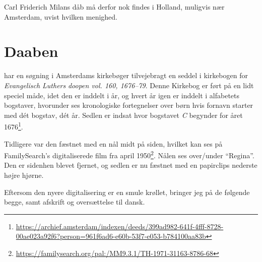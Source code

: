 \documentclass[
	a4paper,
	12pt,
	final
]{memoir}
\begin{document}
Carl Friderich Milans dåb må derfor nok findes i Holland, muligvis nær Amsterdam, uvist hvilken menighed.

\section{Daaben}

 har en søgning i Amsterdams kirkebøger tilvejebragt en seddel i kirkebogen for \emph{Evangelisch Luthers} \emph{doopen vol. 160, 1676--79}. Denne Kirkebog er ført på en lidt speciel måde, idet den er inddelt i år, og hvert år igen er inddelt i alfabetets bogstaver, hvorunder ses kronologiske fortegnelser over børn hvis fornavn starter med dét bogstav, dét år. Sedlen er indsat hvor bogstavet \emph{C} begynder for året 1676\footnote{\url{https://archief.amsterdam/indexen/deeds/399ad982-641f-4fff-8728-00ae023a92f6?person=961f6ad6-e60b-53f7-e053-b784100aa83b}}.

Tidligere var den fæstnet med en nål midt på siden, hvilket kan ses på FamilySearch's digitaliserede film fra april 1950\footnote{\url{https://familysearch.org/pal:/MM9.3.1/TH-1971-31163-8786-68}}. Nålen ses over/under \enquote{Regina}. Den er sidenhen blevet fjernet, og sedlen er nu fæstnet med en papirclips nederste højre hjørne.

Eftersom den nyere digitalisering er en smule krøllet, bringer jeg på de følgende begge, samt afskrift og oversættelse til dansk.

\end{document}

